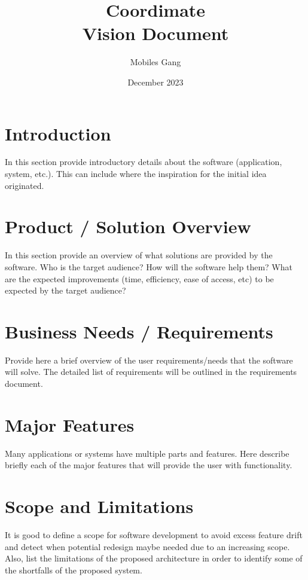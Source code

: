 \documentclass{article}
\title{Coordimate\\Vision Document}
\date{December 2023}
\author{Mobiles Gang}
\begin{document}
\maketitle

\section{Introduction}

In this section provide introductory details about the software (application,
system, etc.). This can include where the inspiration for the initial idea
originated.

\section{Product / Solution Overview}

In this section provide an overview of what solutions are provided by the
software. Who is the target audience? How will the software help them? What are
the expected improvements (time, efficiency, ease of access, etc) to be
expected by the target audience?

\section{Business Needs / Requirements}

Provide here a brief overview of the user requirements/needs that the software
will solve. The detailed list of requirements will be outlined in the
requirements document.

\section{Major Features}

Many applications or systems have multiple parts and features. Here describe
briefly each of the major features that will provide the user with
functionality.

\section{Scope and Limitations}

It is good to define a scope for software development to avoid excess feature
drift and detect when potential redesign maybe needed due to an increasing
scope. Also, list the limitations of the proposed architecture in order to
identify some of the shortfalls of the proposed system.
\end{document}
